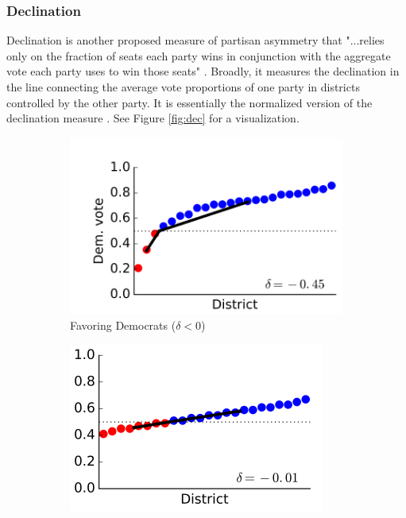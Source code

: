 \subsubsection{Declination}

Declination is another proposed measure of partisan asymmetry that "...relies only on the fraction of seats each party wins in conjunction with the aggregate vote each party uses to win those seats" \parencite[3]{warrington2018}. Broadly, it measures the declination in the line connecting the average vote proportions of one party in districts controlled by the other party. It is essentially the normalized version of the declination measure \parencite{katz2020}. See Figure \ref{fig:dec} for a visualization. 

\begin{figure}
    \centering
    \begin{subfigure}[b]{0.3\textwidth}
        \centering
        \includegraphics[width=\textwidth]{img/dec.dem.PNG}
        \caption{Favoring Democrats ($\delta < 0$)}
        \label{fig:dec.dem}
    \end{subfigure}
    \hfill
    \begin{subfigure}[b]{0.3\textwidth}
        \centering
        \includegraphics[width=\textwidth]{img/dec.flat.PNG}

\end{subfigure}
\end{figure}

